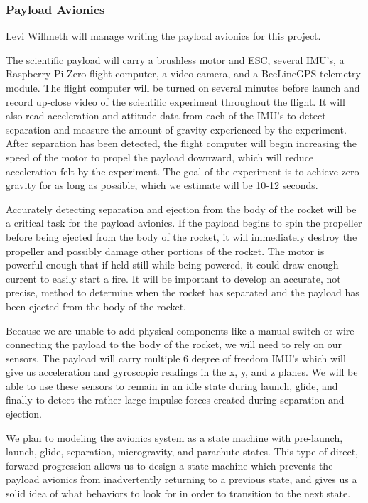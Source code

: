 \documentclass[onecolumn, draftclsnofoot, 10pt, compsoc]{IEEEtran}
\begin{document}
\subsubsection{Payload Avionics}

Levi Willmeth will manage writing the payload avionics for this project.

The scientific payload will carry a brushless motor and ESC, several IMU's, a Raspberry Pi Zero flight computer, a video camera, and a BeeLineGPS telemetry module.  The flight computer will be turned on several minutes before launch and record up-close video of the scientific experiment throughout the flight.  It will also read acceleration and attitude data from each of the IMU's to detect separation and measure the amount of gravity experienced by the experiment.  After separation has been detected, the flight computer will begin increasing the speed of the motor to propel the payload downward, which will reduce acceleration felt by the experiment.  The goal of the experiment is to achieve zero gravity for as long as possible, which we estimate will be 10-12 seconds.

Accurately detecting separation and ejection from the body of the rocket will be a critical task for the payload avionics.  If the payload begins to spin the propeller before being ejected from the body of the rocket, it will immediately destroy the propeller and possibly damage other portions of the rocket.  The motor is powerful enough that if held still while being powered, it could draw enough current to easily start a fire.  It will be important to develop an accurate, not precise, method to determine when the rocket has separated and the payload has been ejected from the body of the rocket.

Because we are unable to add physical components like a manual switch or wire connecting the payload to the body of the rocket, we will need to rely on our sensors.  The payload will carry multiple 6 degree of freedom IMU's which will give us acceleration and gyroscopic readings in the x, y, and z planes.  We will be able to use these sensors to remain in an idle state during launch, glide, and finally to detect the rather large impulse forces created during separation and ejection.

We plan to modeling the avionics system as a state machine with pre-launch, launch, glide, separation, microgravity, and parachute states.  This type of direct, forward progression allows us to design a state machine which prevents the payload avionics from inadvertently returning to a previous state, and gives us a solid idea of what behaviors to look for in order to transition to the next state.
\end{document}
